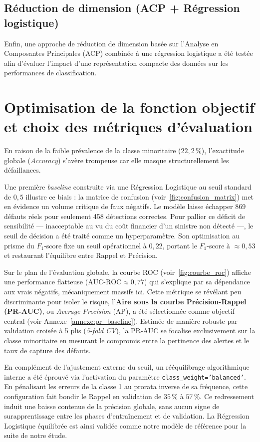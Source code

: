 \documentclass{article}
\begin{document}
\subsection{Réduction de dimension (ACP + Régression logistique)}
Enfin, une approche de réduction de dimension basée sur l'Analyse en Composantes Principales (ACP) combinée à une régression logistique a été testée afin d'évaluer l'impact d'une représentation compacte des données sur les performances de classification.

\section{Optimisation de la fonction objectif et choix des métriques d'évaluation}

En raison de la faible prévalence de la classe minoritaire ($22,2\,\%$), l'exactitude globale (\textit{Accuracy}) s'avère trompeuse car elle masque structurellement les défaillances. 

Une première \textit{baseline} construite via une Régression Logistique au seuil standard de $0,5$ illustre ce biais : la matrice de confusion (voir~\ref{fig:confusion_matrix}) met en évidence un volume critique de faux négatifs. Le modèle laisse échapper 869 défauts réels pour seulement 458 détections correctes. Pour pallier ce déficit de sensibilité — inacceptable au vu du coût financier d'un sinistre non détecté —, le seuil de décision a été traité comme un hyperparamètre. Son optimisation au prisme du $F_1$-score fixe un seuil opérationnel à \textbf{$0,22$}, portant le $F_1$-score à $\approx 0,53$ et restaurant l'équilibre entre Rappel et Précision.

Sur le plan de l'évaluation globale, la courbe ROC (voir~\ref{fig:courbe_roc}) affiche une performance flatteuse ($\text{AUC-ROC} \approx 0,77$) qui s'explique par sa dépendance aux vrais négatifs, mécaniquement massifs ici. Cette métrique se révélant peu discriminante pour isoler le risque, l'\textbf{Aire sous la courbe Précision-Rappel (PR-AUC)}, ou \textit{Average Precision} (AP), a été sélectionnée comme objectif central (voir Annexe~\ref{annexe:pr_baseline}). Estimée de manière robuste par validation croisée à 5 plis (\textit{5-fold CV}), la PR-AUC se focalise exclusivement sur la classe minoritaire en mesurant le compromis entre la pertinence des alertes et le taux de capture des défauts.

En complément de l'ajustement externe du seuil, un rééquilibrage algorithmique interne a été éprouvé via l'activation du paramètre \texttt{class\_weight='balanced'}. En pénalisant les erreurs de la classe 1 au prorata inverse de sa fréquence, cette configuration fait bondir le Rappel en validation de $35\,\%$ à $57\,\%$. Ce redressement induit une baisse contenue de la précision globale, sans aucun signe de surapprentissage entre les phases d'entraînement et de validation. La Régression Logistique équilibrée est ainsi validée comme notre modèle de référence pour la suite de notre étude.
\end{document}
